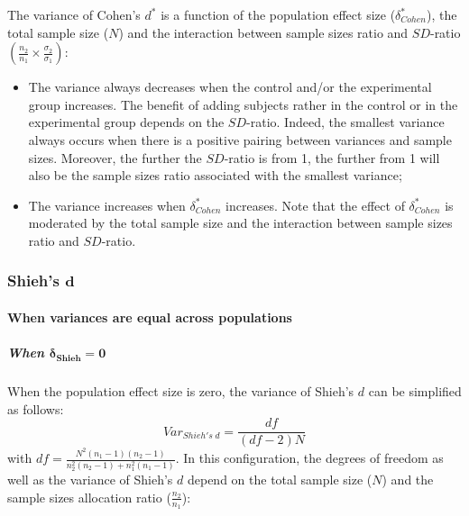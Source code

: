 \documentclass[
  english,
  man,mask]{apa6}
\providecommand{\tightlist}{%
  \setlength{\itemsep}{0pt}\setlength{\parskip}{0pt}}
\let\oldparagraph\paragraph
\renewcommand{\paragraph}[1]{\oldparagraph{#1}\mbox{}}
\let\oldsubparagraph\subparagraph
\renewcommand{\subparagraph}[1]{\oldsubparagraph{#1}\mbox{}}
\begin{document}
The variance of Cohen's \(d^*\) is a function of the population effect size (\(\delta^*_{Cohen}\)), the total sample size (\(N\)) and the interaction between sample sizes ratio and \(SD\)-ratio \(\left(\frac{n_2}{n_1}\times\frac{\sigma_2}{\sigma_1} \right)\):

\begin{itemize}
\tightlist
\item
  The variance always decreases when the control and/or the experimental group increases. The benefit of adding subjects rather in the control or in the experimental group depends on the \(SD\)-ratio. Indeed, the smallest variance always occurs when there is a positive pairing between variances and sample sizes. Moreover, the further the \(SD\)-ratio is from 1, the further from 1 will also be the sample sizes ratio associated with the smallest variance;\\
\item
  The variance increases when \(\delta^*_{Cohen}\) increases. Note that the effect of \(\delta^*_{Cohen}\) is moderated by the total sample size and the interaction between sample sizes ratio and \(SD\)-ratio.
\end{itemize}

\hypertarget{shiehs-bmd}{%
\subsubsection{\texorpdfstring{Shieh's \(\bm{d}\)}{Shieh's \textbackslash bm\{d\}}}\label{shiehs-bmd}}

\hypertarget{when-variances-are-equal-across-populations-5}{%
\paragraph{When variances are equal across populations}\label{when-variances-are-equal-across-populations-5}}

\hypertarget{when-bmdelta_shieh-0}{%
\subparagraph{\texorpdfstring{When \(\bm{\delta_{Shieh} = 0}\)}{When \textbackslash bm\{\textbackslash delta\_\{Shieh\} = 0\}}}\label{when-bmdelta_shieh-0}}

When the population effect size is zero, the variance of Shieh's \(d\) can be simplified as follows:
\[Var_{Shieh's \; d} = \frac{df}{(df-2)N}\]
with \(df = \frac{N^2(n_1-1)(n_2-1)}{n_2^2(n_2-1)+n_1^2(n_1-1)}\). In this configuration, the degrees of freedom as well as the variance of Shieh's \(d\) depend on the total sample size (\(N\)) and the sample sizes allocation ratio (\(\frac{n_2}{n_1}\)):
\end{document}
